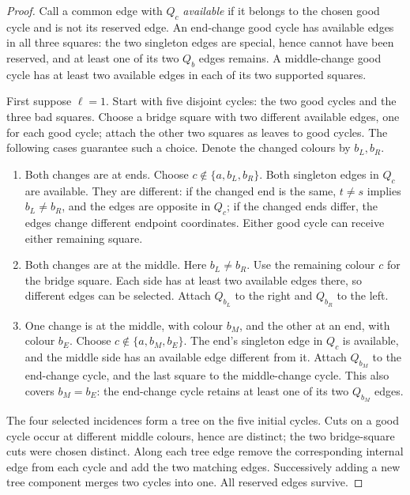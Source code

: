 \documentclass[11pt]{article}
\theoremstyle{remark}
\numberwithin{equation}{section}
\begin{document}
\begin{proof}
Call a common edge with $Q_c$ \emph{available} if it belongs to the
chosen good cycle and is not its reserved edge. An end-change good
cycle has available edges in all three squares: the two singleton
edges are special, hence cannot have been reserved, and at least one
of its two $Q_b$ edges remains. A middle-change good cycle has at least
two available edges in each of its two supported squares.

First suppose $\ell=1$. Start with five disjoint cycles: the two good
cycles and the three bad squares. Choose a bridge square with two
different available edges, one for each good cycle; attach the other
two squares as leaves to good cycles. The following cases guarantee
such a choice. Denote the changed colours by $b_L,b_R$.
\begin{enumerate}
\item Both changes are at ends. Choose $c\notin\{a,b_L,b_R\}$.
      Both singleton edges in $Q_c$ are available. They are different:
      if the changed end is the same, $t\ne s$ implies $b_L\ne b_R$,
      and the edges are opposite in $Q_c$; if the changed ends differ,
      the edges change different endpoint coordinates. Either good
      cycle can receive either remaining square.
\item Both changes are at the middle. Here $b_L\ne b_R$. Use the
      remaining colour $c$ for the bridge square. Each side has at
      least two available edges there, so different edges can be
      selected. Attach $Q_{b_L}$ to the right and $Q_{b_R}$ to the left.
\item One change is at the middle, with colour $b_M$, and the other
      at an end, with colour $b_E$. Choose
      $c\notin\{a,b_M,b_E\}$. The end's singleton edge in $Q_c$ is
      available, and the middle side has an available edge different
      from it. Attach $Q_{b_M}$ to the end-change cycle, and the last
      square to the middle-change cycle. This also covers $b_M=b_E$:
      the end-change cycle retains at least one of its two $Q_{b_M}$
      edges.
\end{enumerate}
The four selected incidences form a tree on the five initial cycles.
Cuts on a good cycle occur at different middle colours, hence are
distinct; the two bridge-square cuts were chosen distinct. Along each
tree edge remove the corresponding internal edge from each cycle and
add the two matching edges. Successively adding a new tree component
merges two cycles into one. All reserved edges survive.


\end{proof}
\end{document}
